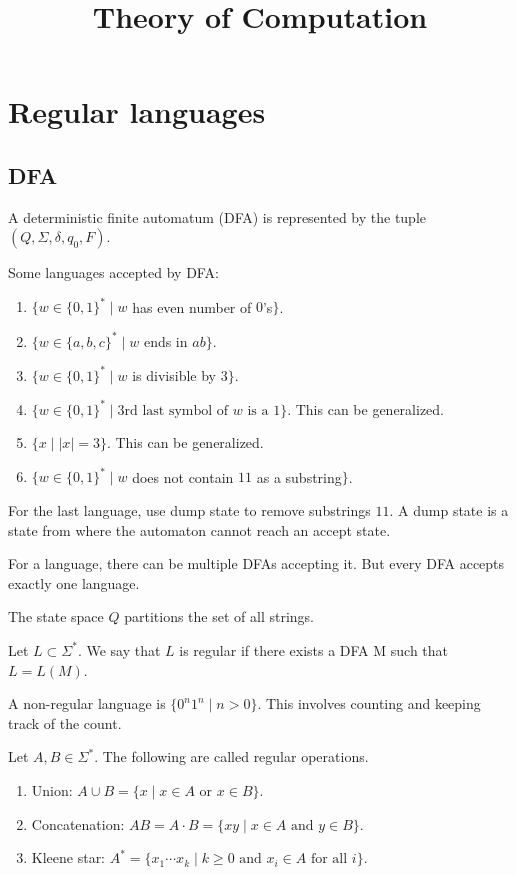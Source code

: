 \documentclass{article}
\begin{document}
\title{Theory of Computation}
\maketitle
\thispagestyle{empty}
\clearpage

\tableofcontents
\clearpage
\section{Regular languages}

\subsection{DFA}

A deterministic finite automatum (DFA) is represented by the tuple $(Q, \Sigma, \delta, q_0, F)$.

Some languages accepted by DFA:

\begin{enumerate}
\item\label{item:1} $\{ w \in \{0, 1\}^{*} \mid w $ has even number of $0$'s$\}$. 
\item\label{item:2} $\{ w \in \{a, b, c\}^{*} \mid w $ ends in $ab\}$. 
\item\label{item:3} $\{ w \in \{0, 1\}^{*} \mid w $ is divisible by $3\}$. 
\item\label{item:12} $\{ w \in \{0, 1\}^{*} \mid \text{3rd last symbol of } w \text{ is a } 1\}$. This can be generalized.
\item\label{item:6} $\{ x \mid |x| = 3\}$. This can be generalized.
\item\label{item:4} $\{ w \in \{0, 1\}^{*} \mid w $ does not contain $11$ as a substring$\}$.
\end{enumerate}

For the last language, use dump state to remove substrings $11$. A dump state is a state from where the automaton cannot reach an accept state.

For a language, there can be multiple DFAs accepting it. But every DFA accepts exactly one language.

The state space $Q$ partitions the set of all strings.

Let $L \subset \Sigma^{*}$. We say that $L$ is regular if there exists a DFA M such that $L = L(M)$.

A non-regular language is $\{ 0^n1^n \mid n > 0\}$. This involves counting and keeping track of the count.

Let $A, B \in \Sigma^{*}$. The following are called regular operations. 
\begin{enumerate}
\item\label{item:7} Union: $A\cup B = \{ x \mid x \in A \text{ or } x\in B \}$. 
\item\label{item:8} Concatenation: $AB = A\cdot B = \{ xy \mid x \in A \text{ and } y \in B \}$. 
\item\label{item:9} Kleene star: $A^{*} = \{x_1\cdots x_k \mid k \geq 0 \text{ and } x_i\in A \text{ for all } i \}$.
\end{enumerate}
\end{document}
